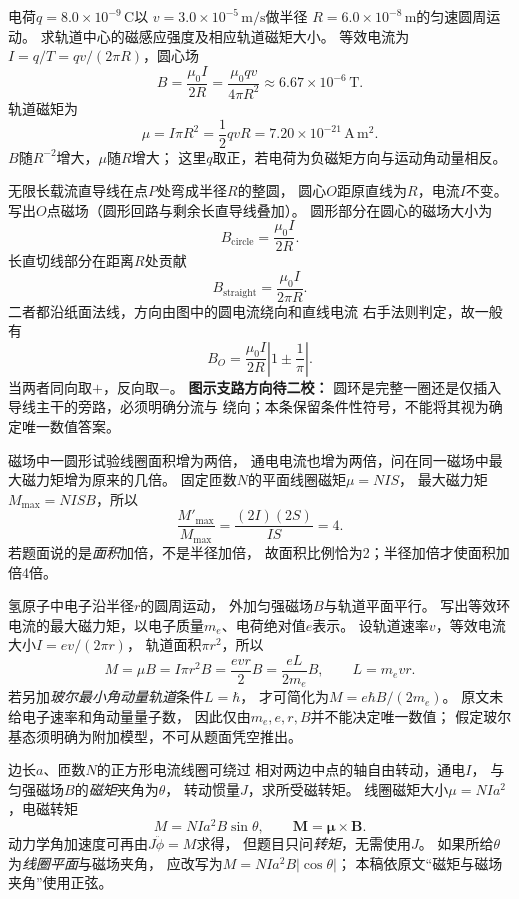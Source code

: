 \problemtext 电荷$q=8.0\times10^{-9}\,\mathrm C$以
$v=3.0\times10^{-5}\,\mathrm{m/s}$做半径
$R=6.0\times10^{-8}\,\mathrm m$的匀速圆周运动。
求轨道中心的磁感应强度及相应轨道磁矩大小。
\workings
等效电流为$I=q/T=qv/(2\pi R)$，圆心场
\[
\boxed{B=\frac{\mu_0I}{2R}
=\frac{\mu_0qv}{4\pi R^2}
\approx6.67\times10^{-6}\,\mathrm T}.
\]
轨道磁矩为
\[
\boxed{\mu=I\pi R^2=\frac12qvR
=7.20\times10^{-21}\,\mathrm{A\,m^2}}.
\]
\crosscheck $B$随$R^{-2}$增大，$\mu$随$R$增大；
这里$q$取正，若电荷为负磁矩方向与运动角动量相反。

\problemtext 无限长载流直导线在点$P$处弯成半径$R$的整圆，
圆心$O$距原直线为$R$，电流$I$不变。
写出$O$点磁场（圆形回路与剩余长直导线叠加）。
\workings
圆形部分在圆心的磁场大小为
\[
B_{\mathrm{circle}}=\frac{\mu_0I}{2R}.
\]
长直切线部分在距离$R$处贡献
\[
B_{\mathrm{straight}}=\frac{\mu_0I}{2\pi R}.
\]
二者都沿纸面法线，方向由图中的圆电流绕向和直线电流
右手法则判定，故一般有
\[
\boxed{B_O=\frac{\mu_0I}{2R}
\left|1\pm\frac1\pi\right|}.
\]
当两者同向取$+$，反向取$-$。
\crosscheck \textbf{图示支路方向待二校：}
圆环是完整一圈还是仅插入导线主干的旁路，必须明确分流与
绕向；本条保留条件性符号，不能将其视为确定唯一数值答案。

\problemtext 磁场中一圆形试验线圈面积增为两倍，
通电电流也增为两倍，问在同一磁场中最大磁力矩增为原来的几倍。
\workings
固定匝数$N$的平面线圈磁矩$\mu=NIS$，
最大磁力矩$M_{\max}=NISB$，所以
\[
\boxed{\frac{M'_{\max}}{M_{\max}}
=\frac{(2I)(2S)}{IS}=4}.
\]
\crosscheck 若题面说的是\emph{面积}加倍，不是半径加倍，
故面积比例恰为2；半径加倍才使面积加倍4倍。

\problemtext 氢原子中电子沿半径$r$的圆周运动，
外加匀强磁场$B$与轨道平面平行。
写出等效环电流的最大磁力矩，以电子质量$m_e$、电荷绝对值$e$表示。
\workings
设轨道速率$v$，等效电流大小$I=ev/(2\pi r)$，
轨道面积$\pi r^2$，所以
\[
\boxed{M=\mu B=I\pi r^2B
=\frac{evr}{2}B
=\frac{eL}{2m_e}B},
\qquad L=m_evr.
\]
若另加\emph{玻尔最小角动量轨道}条件$L=\hbar$，
才可简化为$\boxed{M=e\hbar B/(2m_e)}$。
\crosscheck 原文未给电子速率和角动量量子数，
因此仅由$m_e,e,r,B$并不能决定唯一数值；
假定玻尔基态须明确为附加模型，不可从题面凭空推出。

\problemtext 边长$a$、匝数$N$的正方形电流线圈可绕过
相对两边中点的轴自由转动，通电$I$，
与匀强磁场$B$的\emph{磁矩}夹角为$\theta$，
转动惯量$J$，求所受磁转矩。
\workings
线圈磁矩大小$\mu=NIa^2$，电磁转矩
\[
\boxed{M=NIa^2B\sin\theta},\qquad
\bm M=\bm\mu\times\bm B.
\]
动力学角加速度可再由$J\ddot\phi=M$求得，
但题目只问\emph{转矩}，无需使用$J$。
\crosscheck 如果所给$\theta$为\emph{线圈平面}与磁场夹角，
应改写为$M=NIa^2B|\cos\theta|$；
本稿依原文“磁矩与磁场夹角”使用正弦。

